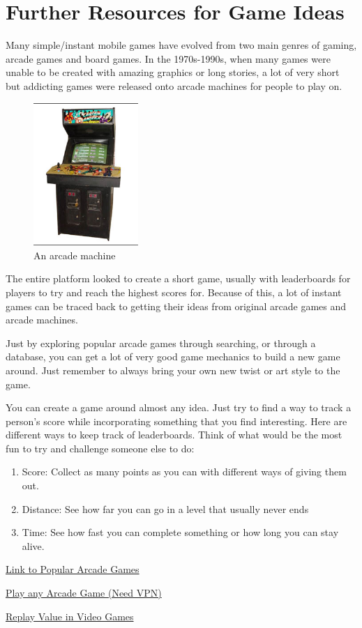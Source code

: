\documentclass{article}
\begin{document}
\section{Further Resources for Game Ideas}
Many simple/instant mobile games have evolved from two main genres of gaming, arcade games and board games. In the 1970s-1990s, when many games were unable to be created with amazing graphics or long stories, a lot of very short but addicting games were released onto arcade machines for people to play on.

\begin{figure}[h]
\centering
 \includegraphics[width = 150px]{images/arcade.png}
\caption{An arcade machine}
\end{figure}
\newpage 

The entire platform looked to create a short game, usually with leaderboards for players to try and reach the highest scores for. Because of this, a lot of instant games can  be traced back to getting their ideas from original arcade games and arcade machines. 

Just by exploring popular arcade games through searching, or through a database, you can get a lot of very good game mechanics to build a new game around. Just remember to always bring your own new twist or art style to the game. 

You can create a game around almost any idea. Just try to find a way to track a person's score while incorporating something that you find interesting. Here are different ways to keep track of leaderboards. Think of what would be the most fun to try and challenge someone else to do:

\begin{enumerate}
\item Score: Collect as many points as you can with different ways of giving them out.
\item Distance: See how far you can go in a level that usually never ends
\item Time: See how fast you can complete something or how long you can stay alive.
\end{enumerate}

\hyperlink{https://en.wikipedia.org/wiki/Arcade_game}{Link to Popular Arcade Games}

\hyperlink{https://archive.org/details/internetarcade}{Play any Arcade Game (Need VPN)}

\hyperlink{https://en.wikipedia.org/wiki/Replay_value}{Replay Value in Video Games}
\end{document}
